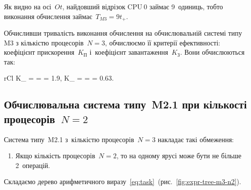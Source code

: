 \documentclass[
	a4paper,
	oneside,
	BCOR = 10mm,
	DIV = 12,
	12pt,
	headings = normal,
]{scrartcl}
\begin{document}
				Як видно на осі~$Ot$, найдовший відрізок $\text{CPU}~0$ займає 9~одиниць, тобто виконання обчислення займає~$T_{M3} = 9t_{+}$.

				Обчисливши тривалість виконання обчислення на обчислювальній системі типу M3 з кількістю процесорів~$N = 3$, обчислюємо її критерії ефективності: коефіцієнт прискорення~$K_{\text{П}}$ і~коефіцієнт завантаження~$K_{\text{З}}$. Вони обчислюються так:
				\begin{IEEEeqnarray*}{rCl}
					K_{} =  =  = \num{1.9}, \quad
					K_{} =  =  = \num{0.63}.
				\end{IEEEeqnarray*}

			\subsection{Обчислювальна система типу~M2.1 при кількості процесорів~$N = 2$}
				Система типу~M2.1 з~кількістю процесорів~$N = 3$ накладає такі обмеження:
					\begin{enumerate}
						\item Якщо кількість процесорів~$N = 2$, то на одному ярусі може бути не більше 2~операцій.
					\end{enumerate}
				Складаємо дерево арифметичного виразу~\eqref{eq:task}~(рис.~\ref{fig:expr-tree-m3-n2}).
\end{document}
